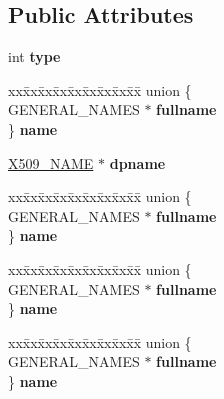 \subsection*{Public Attributes}
\begin{DoxyCompactItemize}
\item 
\mbox{\label{structDIST__POINT__NAME__st_a86c9aa0170afe2c241c5536f45d15b46}} 
int {\bfseries type}
\item 
\mbox{\label{structDIST__POINT__NAME__st_a6c50c8e8be0a141c0eee6d39779a5ddc}} 
\begin{tabbing}
xx\=xx\=xx\=xx\=xx\=xx\=xx\=xx\=xx\=\kill
union \{\\
\>GENERAL\_NAMES $\ast$ {\bfseries fullname}\\
\} {\bfseries name}\\

\end{tabbing}\item 
\mbox{\label{structDIST__POINT__NAME__st_a9375981df805876ea9540126805cc285}} 
\hyperlink{structX509__name__st}{X509\+\_\+\+N\+A\+ME} $\ast$ {\bfseries dpname}
\item 
\mbox{\label{structDIST__POINT__NAME__st_a4457b775f79ec83ee719543fb08a9bb2}} 
\begin{tabbing}
xx\=xx\=xx\=xx\=xx\=xx\=xx\=xx\=xx\=\kill
union \{\\
\>GENERAL\_NAMES $\ast$ {\bfseries fullname}\\
\} {\bfseries name}\\

\end{tabbing}\item 
\mbox{\label{structDIST__POINT__NAME__st_a5d3842ca0a026b1cbdefcf1dfcd5e4f3}} 
\begin{tabbing}
xx\=xx\=xx\=xx\=xx\=xx\=xx\=xx\=xx\=\kill
union \{\\
\>GENERAL\_NAMES $\ast$ {\bfseries fullname}\\
\} {\bfseries name}\\

\end{tabbing}\item 
\mbox{\label{structDIST__POINT__NAME__st_a81071cb0cf02a2838e13500fc026a0dc}} 
\begin{tabbing}
xx\=xx\=xx\=xx\=xx\=xx\=xx\=xx\=xx\=\kill
union \{\\
\>GENERAL\_NAMES $\ast$ {\bfseries fullname}\\
\} {\bfseries name}\\


\end{tabbing}
\end{DoxyCompactItemize}
